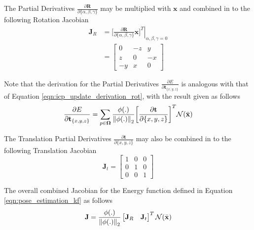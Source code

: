 The Partial Derivatives
$\frac{\partial \mathbf{R}}{\partial \{\alpha, \beta, \gamma\}}$ may be
multiplied with $\mathbf{x}$ and combined in to the following Rotation Jacobian
\begin{align}
  \label{eqn:rot_jac}
  \mathbf{J}_{R} & = \left. \bigg[
    \frac{\partial \mathbf{R}}{\partial \{\alpha, \beta, \gamma\}} \mathbf{x}
    \bigg]^{T} \right\vert_{\alpha,\beta,\gamma = 0} \\
  & =
  \begin{bmatrix}
    0 & -z & y \\
    z & 0 & -x \\
    -y & x & 0
  \end{bmatrix}
\end{align}

Note that the derivation for the Partial Derivatives
$\frac{\partial E}{\partial \mathbf{t}_{\{x, y, z\}}}$ is analogous with that of
Equation \ref{eqn:icp_update_derivation_rot}, with the result given as follows
\begin{equation}
  \label{eqn:icp_update_derivation_trans}
  \frac{\partial E}{\partial \mathbf{t}_{\{x, y, z\}}} =
  \sum_{p \in \mathbf{\Omega}}
  \frac{\phi(.)}{\left\lVert\phi(.)\right\rVert_{2}}
  \bigg[ \frac{\partial \mathbf{t}}{\partial \{x, y, z\}}\bigg]^{T}
  \mathcal{N}(\bar{\mathbf{x}})
\end{equation}

The Translation Partial Derivatives
$\frac{\partial \mathbf{t}}{\partial \{x, y, z\}}$ may also be combined in to
the following Translation Jacobian
\begin{equation}
  \label{eqn:trans_jac}
  \mathbf{J}_{t} =
  \begin{bmatrix}
    1 & 0 & 0 \\
    0 & 1 & 0 \\
    0 & 0 & 1
  \end{bmatrix}
\end{equation}

The overall combined Jacobian for the Energy function defined in Equation
\ref{eqn:pose_estimation_kf} as follows
\begin{equation}
  \label{eqn:pose_jacobian}
  \mathbf{J} =
  \frac{\phi(.)}{\left\lVert\phi(.)\right\rVert_{2}}
  \begin{bmatrix}
    \mathbf{J}_{R} & \mathbf{J}_{t}
  \end{bmatrix}^{T}
  \mathcal{N}(\bar{\mathbf{x}})
\end{equation}

